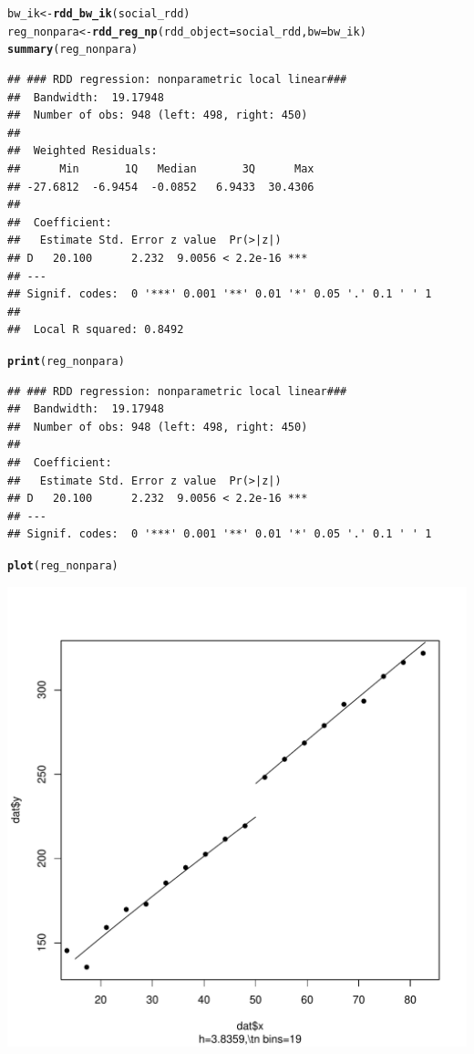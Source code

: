 \documentclass[12pt]{article}\usepackage[]{graphicx}\usepackage[]{color}
\makeatletter
\def\maxwidth{ %
  \ifdim\Gin@nat@width>\linewidth
    \linewidth
  \else
    \Gin@nat@width
  \fi
}
\newcommand{\hlstd}[1]{\textcolor[rgb]{0.345,0.345,0.345}{#1}}%
\newcommand{\hlkwb}[1]{\textcolor[rgb]{0.69,0.353,0.396}{#1}}%
\newcommand{\hlkwc}[1]{\textcolor[rgb]{0.333,0.667,0.333}{#1}}%
\newcommand{\hlkwd}[1]{\textcolor[rgb]{0.737,0.353,0.396}{\textbf{#1}}}%
\newenvironment{kframe}{%
 \def\at@end@of@kframe{}%
 \ifinner\ifhmode%
  \def\at@end@of@kframe{\end{minipage}}%
  \begin{minipage}{\columnwidth}%
 \fi\fi%
 \def\FrameCommand##1{\hskip\@totalleftmargin \hskip-\fboxsep
 \colorbox{shadecolor}{##1}\hskip-\fboxsep
     \hskip-\linewidth \hskip-\@totalleftmargin \hskip\columnwidth}%
 \MakeFramed {\advance\hsize-\width
   \@totalleftmargin\z@ \linewidth\hsize
   \@setminipage}}%
 {\par\unskip\endMakeFramed%
 \at@end@of@kframe}
\newenvironment{knitrout}{}{} %
\makeatother
\begin{document}
\begin{knitrout}
\color{fgcolor}\begin{kframe}
\begin{alltt}
\hlstd{bw_ik} \hlkwb{<-} \hlkwd{rdd_bw_ik}\hlstd{(social_rdd)}
\hlstd{reg_nonpara} \hlkwb{<-} \hlkwd{rdd_reg_np}\hlstd{(}\hlkwc{rdd_object} \hlstd{= social_rdd,} \hlkwc{bw} \hlstd{= bw_ik)}
\hlkwd{summary}\hlstd{(reg_nonpara)}
\end{alltt}
\begin{verbatim}
## ### RDD regression: nonparametric local linear###
## 	Bandwidth:  19.17948 
## 	Number of obs: 948 (left: 498, right: 450)
## 
## 	Weighted Residuals:
##      Min       1Q   Median       3Q      Max 
## -27.6812  -6.9454  -0.0852   6.9433  30.4306 
## 
## 	Coefficient:
##   Estimate Std. Error z value  Pr(>|z|)    
## D   20.100      2.232  9.0056 < 2.2e-16 ***
## ---
## Signif. codes:  0 '***' 0.001 '**' 0.01 '*' 0.05 '.' 0.1 ' ' 1
## 
## 	Local R squared: 0.8492
\end{verbatim}
\begin{alltt}
\hlkwd{print}\hlstd{(reg_nonpara)}
\end{alltt}
\begin{verbatim}
## ### RDD regression: nonparametric local linear###
## 	Bandwidth:  19.17948 
## 	Number of obs: 948 (left: 498, right: 450)
## 
## 	Coefficient:
##   Estimate Std. Error z value  Pr(>|z|)    
## D   20.100      2.232  9.0056 < 2.2e-16 ***
## ---
## Signif. codes:  0 '***' 0.001 '**' 0.01 '*' 0.05 '.' 0.1 ' ' 1
\end{verbatim}
\begin{alltt}
\hlkwd{plot}\hlstd{(reg_nonpara)}
\end{alltt}
\end{kframe}
\includegraphics[width=\maxwidth]{figure/unnamed-chunk-12-1} 

\end{knitrout}
\end{document}
